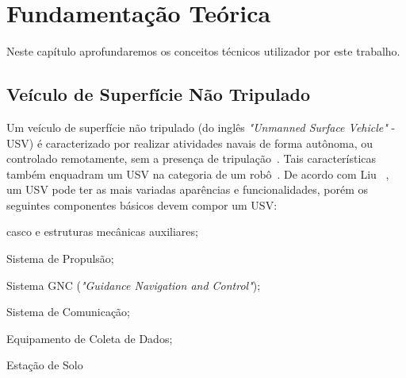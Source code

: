


\chapter{Fundamentação Teórica}\label{chap2:fund_teo}
    Neste capítulo aprofundaremos os conceitos técnicos utilizador por este trabalho.
    \section{Veículo de Superfície Não Tripulado}\label{subchap2:USV}
        Um veículo de superfície não tripulado (do inglês \textit{"Unmanned Surface Vehicle"} - USV) é caracterizado por realizar atividades navais de forma autônoma, ou controlado remotamente, sem a presença de tripulação~\cite{LIU201671}. Tais características também enquadram um USV na categoria de um robô~\cite{JURAK2020}.
        De acordo com Liu \etal~\cite{LIU201671}, um USV pode ter as mais variadas aparências e funcionalidades, porém os seguintes componentes básicos devem compor um USV: 
        \begin{enumerate*}[label=\alph*)]
            \item casco e estruturas mecânicas auxiliares;
            \item Sistema de Propulsão;
            \item Sistema GNC (\textit{"Guidance Navigation and Control"});
            \item Sistema de Comunicação;
            \item Equipamento de Coleta de Dados;
            \item Estação de Solo
        \end{enumerate*}
        
